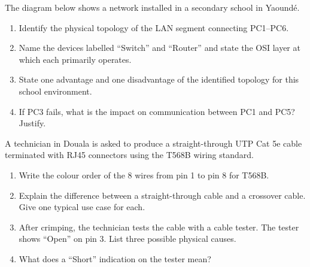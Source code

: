 \documentclass[11pt]{article}
\newcounter{popsec}
\newcounter{popsub}
\newcommand{\courssub}[1]{%
  \stepcounter{popsub}%
  \par\vspace{9pt}\noindent{\popxbold\fontsize{11.5}{13}\selectfont\color{popink}{\color{poporange}\thepopsec.\thepopsub}\hspace{6pt}#1}\par\nopagebreak\vspace{4pt}
}
\begin{document}
\courssub{I practise}

\begin{exercice}
The diagram below shows a network installed in a secondary school in Yaoundé. 
\begin{center}
\end{center}
\begin{enumerate}
\item Identify the physical topology of the LAN segment connecting PC1–PC6.
\item Name the devices labelled ``Switch'' and ``Router'' and state the OSI layer at which each primarily operates.
\item State one advantage and one disadvantage of the identified topology for this school environment.
\item If PC3 fails, what is the impact on communication between PC1 and PC5? Justify.
\end{enumerate}
\end{exercice}

\begin{exercice}
A technician in Douala is asked to produce a straight-through UTP Cat 5e cable terminated with RJ45 connectors using the T568B wiring standard.
\begin{enumerate}
\item Write the colour order of the 8 wires from pin 1 to pin 8 for T568B.
\item Explain the difference between a straight-through cable and a crossover cable. Give one typical use case for each.
\item After crimping, the technician tests the cable with a cable tester. The tester shows ``Open'' on pin 3. List three possible physical causes.
\item What does a ``Short'' indication on the tester mean?
\end{enumerate}
\end{exercice}
\end{document}
